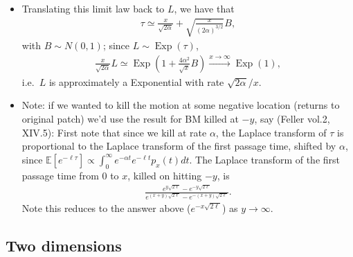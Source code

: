 \documentclass{article}
\newcommand{\E}{\mathbb{E}}
\newcommand{\Exp}{\mathop{\mbox{Exp}}}
\begin{document}
\begin{itemize}
\item Translating this limit law back to $L$, we have that
\begin{align}
  \tau \simeq \frac{x}{\sqrt{2\alpha}} + \sqrt{\frac{x}{(2\alpha)^{3/2}}} B,
\end{align}
with $B \sim N(0,1)$; since $L \sim \Exp(\tau)$,
\begin{align}
  \frac{x}{\sqrt{2\alpha}} L \simeq \Exp\left(1+\frac{4\alpha^2}{\sqrt{x}}B\right) \xrightarrow{x\to\infty} \Exp(1),
\end{align}
i.e.\ $L$ is approximately a Exponential with rate $\sqrt{2\alpha}/x$.

\item Note: if we wanted to kill the motion at some negative location (returns to original patch)
we'd use the result for BM killed at $-y$, say (Feller vol.2, XIV.5):
First note that since we kill at rate $\alpha$, the Laplace transform of $\tau$ is proportional to the Laplace transform of the first passage time,
shifted by $\alpha$, since $\E[e^{-\ell \tau}] \propto \int_0^\infty e^{-\alpha t} e^{-\ell t} p_x(t) dt$.
The Laplace transform of the first passage time from $0$ to $x$, killed on hitting $-y$, is
\begin{align}
 \frac{ e^{y\sqrt{2\ell}} - e^{-y\sqrt{2\ell}} } { e^{(x+y)\sqrt{2\ell}} - e^{-(x+y)\sqrt{2\ell}} } .
\end{align}
Note this reduces to the answer above ($e^{-x\sqrt{2\ell}}$) as $y \to \infty$.


\end{itemize}

\subsection{Two dimensions}
\end{document}
